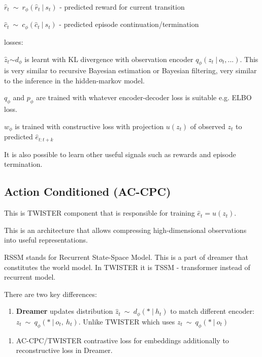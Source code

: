 ${\widehat{r}}_{t}\  \sim \ r_{\phi}({\widehat{r}}_{t}\ |\ s_{t})$ - predicted reward for current transition

${\widehat{c}}_{t}\  \sim \ c_{\phi}({\widehat{c}}_{t}\ |\ s_{t})$ - predicted episode continuation/termination

losses:


${\widehat{z}}_{t}{\sim d}_{\phi}$ is learnt with KL divergence with observation encoder $q_{\phi}(z_{t}\ |\ o_{t},...)$. 
This is very similar to recursive Bayesian estimation or Bayesian filtering, very similar to the inference in the hidden-markov model.

$q_{\phi}$ and $p_{\phi}$ are trained with whatever encoder-decoder loss is suitable e.g. ELBO loss.

$w_{\phi}$ is trained with constructive loss with projection $u(z_{t})$ of observed $z_{t}$ to predicted ${\widehat{e}}_{t:t + k}$

It is also possible to learn other useful signals such as rewards and episode termination.


\subsection{Action Conditioned (AC-CPC)}\label{action-conditioned-ac-cpc}

This is TWISTER component that is responsible for training ${\widehat{e}}_{t} = u(z_{t})$.

This is an architecture that allows compressing high-dimensional observations into useful representations.

RSSM stands for Recurrent State-Space Model. This is a part of dreamer that constitutes the world model. In TWISTER it is TSSM - transformer instead of recurrent model.

There are two key differences:

\begin{enumerate}
\def\labelenumi{\arabic{enumi})}
\item
  \textbf{Dreamer} updates distribution ${\widehat{z}}_{t}\  \sim \ d_{\phi}(*\ |\ h_{t})$ to match different encoder: $z_{t}\  \sim \ q_{\phi}(*\ |\ o_{t},\ h_{t})$.  Unlike TWISTER which uses $z_{t}\  \sim \ q_{\phi}(*\ |\ o_{t})$
\end{enumerate}



\begin{enumerate}
\def\labelenumi{\arabic{enumi})}
\setcounter{enumi}{1}
\item
  AC-CPC/TWISTER contrastive loss for embeddings additionally to reconstructive loss in Dreamer.
\end{enumerate}

